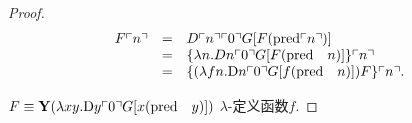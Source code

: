 \begin{proof}
    \[
\begin{array}{rcl}
F\ulcorner{n}\urcorner & = & D\ulcorner{n}\urcorner\ulcorner{0}\urcorner
G[F(\mathrm{pred} \ulcorner{n}\urcorner)] \\
&=  &
\{ \lambda n. Dn\ulcorner{0}\urcorner
G[F(\mathrm{pred}\quad n)] \} \ulcorner{n}\urcorner \\
& = &
\{ (\lambda fn.
 \mathrm{D}n\ulcorner{0}\urcorner
G[f(\mathrm{pred}\quad n)]) F \} \ulcorner{n}\urcorner. \\
\end{array}
\]

$F\equiv \mathbf{Y}(\lambda xy.
 \mathrm{D}y\ulcorner{0}\urcorner
G[x(\mathrm{pred}\quad y)])$ $\lambda$-定义函数$f$.
\end{proof}